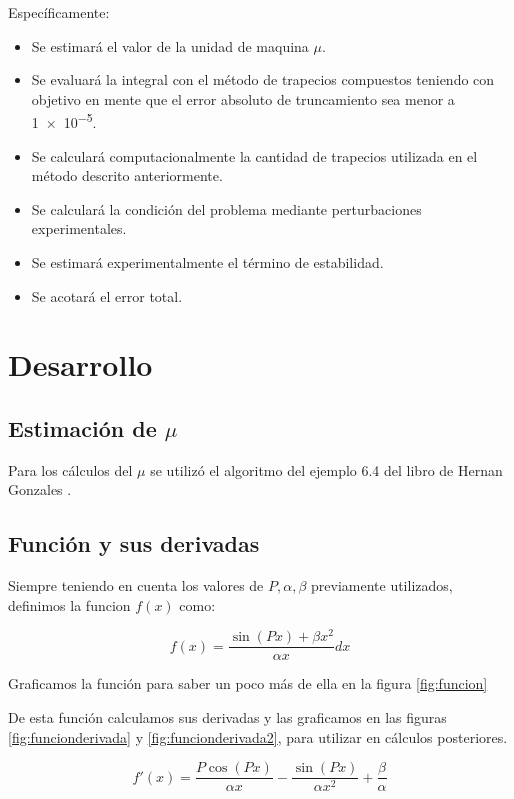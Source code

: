 \documentclass[11pt,a4paper]{article}
\begin{document}
Específicamente:

\begin{itemize}
\item Se estimará el valor de la unidad de maquina \( \mu \).
\item Se evaluará la integral con el método de trapecios compuestos teniendo con objetivo en mente que el error absoluto de truncamiento sea menor a \num{1e-5}.
\item Se calculará computacionalmente la cantidad de trapecios utilizada en el método descrito anteriormente.
\item Se calculará la condición del problema mediante perturbaciones experimentales.
\item Se estimará experimentalmente el término de estabilidad.
\item Se acotará el error total.
\end{itemize}

\section{Desarrollo}

\subsection{Estimación de \( \mu \) }

Para los cálculos del \( \mu \) se utilizó el algoritmo del ejemplo 6.4 del libro de Hernan Gonzales \cite{Gonzales}.

\subsection{Función y sus derivadas}

Siempre teniendo en cuenta los valores de \(P, \alpha, \beta \) previamente utilizados, definimos la funcion \( f(x) \) como:

\[ f(x) = \frac{\sin{(P x)}  + \beta x^2}{\alpha x} dx \]

Graficamos la función para saber un poco más de ella en la figura \ref{fig:funcion}



De esta función calculamos sus derivadas y las graficamos en las figuras \ref{fig:funcionderivada} y \ref{fig:funcionderivada2}, para utilizar en cálculos posteriores.

\[ f'(x) = \frac{P \cos{(P x)}}{\alpha x} - \frac{ \sin{(P x)}}{\alpha x^2} + \frac{\beta}{\alpha} \]
\end{document}
